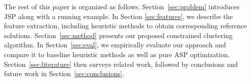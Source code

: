 \documentclass[runningheads]{llncs}
\begin{document}



The rest of this paper is organized as follows. Section~\ref{sec:problem} introduces JSP along with a running example. In Section \ref{sec:features}, we describe the feature extraction, including heuristic methods to obtain corresponding reference solutions. Section~\ref{sec:method} presents our proposed constrained clustering algorithm. In Section~\ref{sec:eval}, we empirically evaluate our approach and compare it to baseline heuristic methods as well as pure ASP optimization. Section~\ref{sec:literature} then surveys related work, followed by conclusions and future work in Section~\ref{sec:conclusions}.
\end{document}
